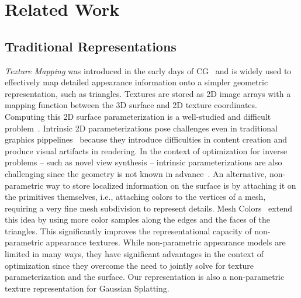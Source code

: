 \section{Related Work}

\subsection{Traditional Representations}


\emph{Texture Mapping} was introduced in the early days of CG~\cite{catmull1974subdivision} and is widely used to effectively map detailed appearance information onto a simpler geometric representation, such as triangles. Textures are stored as 2D image arrays with a mapping function between the 3D surface and 2D texture coordinates. Computing this 2D surface parameterization is a well-studied and difficult problem~\cite{hormann2007mesh, li2018optcuts, srinivasan2024nuvo}. Intrinsic 2D parameterizations pose challenges even in traditional graphics pippelines~\cite{yuksel2019rethinking} because they introduce difficulties in content creation and produce visual artifacts in rendering. In the context of optimization for inverse problems -- such as novel view synthesis -- intrinsic parameterizations are also challenging since the geometry is not known in advance~\cite{srinivasan2024nuvo}. An alternative, non-parametric way to store localized information on the surface is by attaching it on the primitives themselves, i.e.,  attaching colors to the vertices of a mesh, requiring a very fine mesh subdivision to represent details. Mesh Colors~\cite{yuksel2010mesh,mallett2020patch} extend this idea by using more color samples along the edges and the faces of the triangles. This significantly improves the representational capacity of non-parametric appearance textures. While non-parametric appearance models are limited in many ways, they have significant advantages in the context of optimization since they overcome the need to jointly solve for texture parameterization and the surface. Our representation is also a non-parametric texture representation for Gaussian Splatting.

